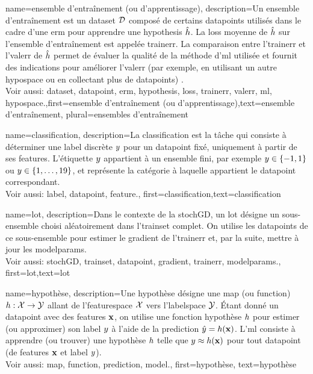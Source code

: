{name={ensemble d'entraînement (ou d'apprentissage)},
	description={Un ensemble d'entraînement est un \gls{dataset} $\mathcal{D}$ composé de certains \glspl{datapoint} utilisés dans le cadre d'une \gls{erm} 
		pour apprendre une \gls{hypothesis} $\hat{h}$. La \gls{loss} moyenne de $\hat{h}$ sur 
		l'ensemble d'entraînement est appelée \gls{trainerr}. La comparaison entre l'\gls{trainerr} et l'\gls{valerr} de $\hat{h}$ permet de évaluer la qualité de la méthode d'\gls{ml} utilisée et fournit des indications 
		pour améliorer l'\gls{valerr} (par exemple, en utilisant un autre \gls{hypospace} ou en collectant plus de \glspl{datapoint}) \cite[Sec. 6.6]{MLBasics}.
		\\
		Voir aussi: \gls{dataset}, \gls{datapoint}, \gls{erm}, \gls{hypothesis}, \gls{loss}, \gls{trainerr}, \gls{valerr}, \gls{ml}, \gls{hypospace}.},first={ensemble d'entraînement (ou d'apprentissage)},text={ensemble d'entraînement}, plural={ensembles d'entraînement}  
}

{name={classification},
	description={La classification est la tâche qui consiste à déterminer une \gls{label} discrète $y$ pour un \gls{datapoint} fixé, uniquement à partir de ses \glspl{feature}. L'étiquette $y$ appartient à un ensemble fini, par exemple $y \in \{-1,1\}$ ou $y \in \{1,\ldots,19\}$, et représente la catégorie à laquelle appartient le \gls{datapoint} correspondant.
		\\ 
		Voir aussi: \gls{label}, \gls{datapoint}, \gls{feature}.},
	first={classification},text={classification} 
}

{
	name={lot},
	description={Dans le contexte de la \gls{stochGD}, un lot désigne un sous-ensemble choisi aléatoirement dans l’\gls{trainset} complet. On utilise les \glspl{datapoint} de ce sous-ensemble pour estimer le \gls{gradient} de l’\gls{trainerr} et, par la suite, mettre à jour les \gls{modelparams}.
		\\
		Voir aussi: \gls{stochGD}, \gls{trainset}, \gls{datapoint}, \gls{gradient}, \gls{trainerr}, \gls{modelparams}.}, 
	first={lot},text={lot}  
}

{name={hypothèse},
	description={Une hypothèse désigne une \gls{map} (ou \gls{function}) $h: \mathcal{X} \rightarrow \mathcal{Y}$ allant de l'\gls{featurespace} $\mathcal{X}$ vers l'\gls{labelspace} $\mathcal{Y}$. 
		Étant donné un \gls{datapoint} avec des \glspl{feature} ${\bf x}$, on utilise une fonction hypothèse $h$
		pour estimer (ou approximer) son \gls{label} $y$ à l’aide de la \gls{prediction}  
		$\hat{y} = h({\bf x})$. L’\gls{ml} consiste à apprendre (ou trouver) une 
		hypothèse $h$ telle que $y \approx h({\bf x})$ 
		pour tout \gls{datapoint} (de \glspl{feature} ${\bf x}$ et \gls{label} $y$).
		\\ 
		Voir aussi: \gls{map}, \gls{function}, \gls{prediction}, \gls{model}.},
	first={hypothèse}, text={hypothèse}
}


